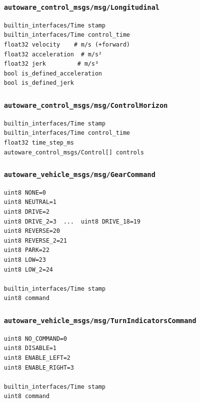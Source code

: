 \documentclass[
]{article}
\begin{document}
\subsubsection{\texorpdfstring{\texttt{autoware\_control\_msgs/msg/Longitudinal}}{autoware\_control\_msgs/msg/Longitudinal}}\label{autoware_control_msgsmsglongitudinal}

\begin{verbatim}
builtin_interfaces/Time stamp
builtin_interfaces/Time control_time
float32 velocity    # m/s (+forward)
float32 acceleration  # m/s²
float32 jerk         # m/s³
bool is_defined_acceleration
bool is_defined_jerk
\end{verbatim}

\subsubsection{\texorpdfstring{\texttt{autoware\_control\_msgs/msg/ControlHorizon}}{autoware\_control\_msgs/msg/ControlHorizon}}\label{autoware_control_msgsmsgcontrolhorizon}

\begin{verbatim}
builtin_interfaces/Time stamp
builtin_interfaces/Time control_time
float32 time_step_ms
autoware_control_msgs/Control[] controls
\end{verbatim}

\subsubsection{\texorpdfstring{\texttt{autoware\_vehicle\_msgs/msg/GearCommand}}{autoware\_vehicle\_msgs/msg/GearCommand}}\label{autoware_vehicle_msgsmsggearcommand}

\begin{verbatim}
uint8 NONE=0
uint8 NEUTRAL=1
uint8 DRIVE=2
uint8 DRIVE_2=3  ...  uint8 DRIVE_18=19
uint8 REVERSE=20
uint8 REVERSE_2=21
uint8 PARK=22
uint8 LOW=23
uint8 LOW_2=24

builtin_interfaces/Time stamp
uint8 command
\end{verbatim}

\subsubsection{\texorpdfstring{\texttt{autoware\_vehicle\_msgs/msg/TurnIndicatorsCommand}}{autoware\_vehicle\_msgs/msg/TurnIndicatorsCommand}}\label{autoware_vehicle_msgsmsgturnindicatorscommand}

\begin{verbatim}
uint8 NO_COMMAND=0
uint8 DISABLE=1
uint8 ENABLE_LEFT=2
uint8 ENABLE_RIGHT=3

builtin_interfaces/Time stamp
uint8 command
\end{verbatim}
\end{document}
